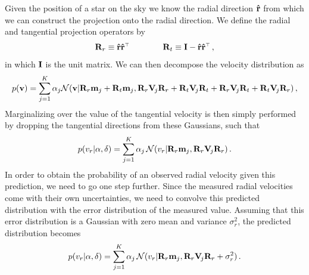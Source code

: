 Given the position of a star on the sky we know the radial direction
$\mathbf{\hat{r}}$ from which we can construct the projection onto the radial
direction. We define the radial and tangential projection operators by
\begin{equation}
\mathbf{R}_r \equiv \mathbf{\hat{r}}\mathbf{\hat{r}}^{\scriptscriptstyle \top} \qquad \qquad \mathbf{R}_t \equiv \mathbf{I} - \mathbf{\hat{r}}\mathbf{\hat{r}}^{\scriptscriptstyle \top}\, ,
\end{equation}
in which $\mathbf{I}$ is the unit matrix. We can then decompose the
velocity distribution as
\begin{equation}\label{eq:radialdecomp}
p(\boldsymbol{\mathbf{v}}) = \sum_{j=1}^K \alpha_j \mathcal{N}(\boldsymbol{\mathbf{v}}|\mathbf{R}_r \mathbf{m}_j+
\mathbf{R}_t \mathbf{m}_j, \mathbf{R}_r \mathbf{V}_{\!j}\mathbf{R}_r +\mathbf{R}_t \mathbf{V}_{\!j}\mathbf{R}_t + \mathbf{R}_r\mathbf{V}_{\!j}\mathbf{R}_t + \mathbf{R}_t\mathbf{V}_{\!j}\mathbf{R}_r )\, ,
\end{equation}
Marginalizing over the value of the tangential velocity is then simply
performed by dropping the tangential directions from these Gaussians,
such that
\begin{equation}
p(v_r|\alpha,\delta) = \sum_{j=1}^K \alpha_j\,
\mathcal{N}(v_r|\mathbf{R}_r \mathbf{m}_j,\mathbf{R}_r \mathbf{V}_{\!j}\mathbf{R}_r)\, .
\end{equation}
In order to obtain the probability of an observed radial velocity
given this prediction, we need to go one step further. Since the
measured radial velocities come with their own uncertainties, we need
to convolve this predicted distribution with the error distribution of
the measured value. Assuming that this error distribution is a
Gaussian with zero mean and variance $\sigma_r^2$, the predicted
distribution becomes
\begin{equation}\label{eq:margpredicted}
p(v_r|\alpha,\delta) = \sum_{j=1}^K \alpha_j\,
\mathcal{N}(v_r|\mathbf{R}_r \mathbf{m}_j,\mathbf{R}_r \mathbf{V}_{\!j}\mathbf{R}_r +\sigma_r^2)\, .
\end{equation}

